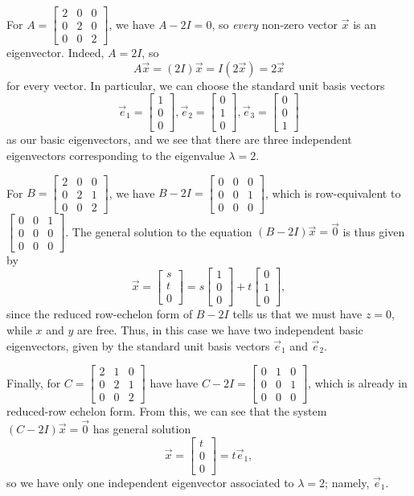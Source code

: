 \documentclass[12pt,letterpaper]{article}
\newcommand{\bbm}{\begin{bmatrix}}
\newcommand{\ebm}{\end{bmatrix}}
\begin{document}
For $A = \bbm 2&0&0\\0&2&0\\0&0&2\ebm$, we have $A-2I = 0$, so \textit{every} non-zero vector $\vec{x}$ is an eigenvector. Indeed, $A=2I$, so
\[
 A\vec{x} = (2I)\vec{x} = I(2\vec{x}) = 2\vec{x}
\]
for every vector. In particular, we can choose the standard unit basis vectors
\[
 \vec{e}_1 = \bbm 1\\0\\0\ebm, \vec{e}_2 = \bbm 0\\1\\0\ebm, \vec{e}_3 = \bbm 0\\0\\1\ebm 
\]
as our basic eigenvectors, and we see that there are three independent eigenvectors corresponding to the eigenvalue $\lambda=2$.

For $B = \bbm 2&0&0\\0&2&1\\0&0&2\ebm$, we have $B-2I = \bbm 0&0&0\\0&0&1\\0&0&0\ebm$, which is row-equivalent to $\bbm 0&0&1\\0&0&0\\0&0&0\ebm$. The general solution to the equation $(B-2I)\vec{x}=\vec{0}$ is thus given by
\[
 \vec{x} = \bbm s\\t\\0\ebm = s\bbm 1\\0\\0\ebm + t\bbm 0\\1\\0\ebm,
\]
since the reduced row-echelon form of $B-2I$ tells us that we must have $z=0$, while $x$ and $y$ are free. Thus, in this case we have two independent basic eigenvectors, given by the standard unit basis vectors $\vec{e}_1$ and $\vec{e}_2$.

Finally, for $C= \bbm 2&1&0\\0&2&1\\0&0&2\ebm$ have have $C-2I = \bbm 0&1&0\\0&0&1\\0&0&0\ebm$, which is already in reduced-row echelon form. From this, we can see that the system $(C-2I)\vec{x}=\vec{0}$ has general solution
\[
 \vec{x} = \bbm t\\0\\0\ebm = t\vec{e}_1,
\]
so we have only one independent eigenvector associated to $\lambda=2$; namely, $\vec{e}_1$.

\bigskip
\end{document}
